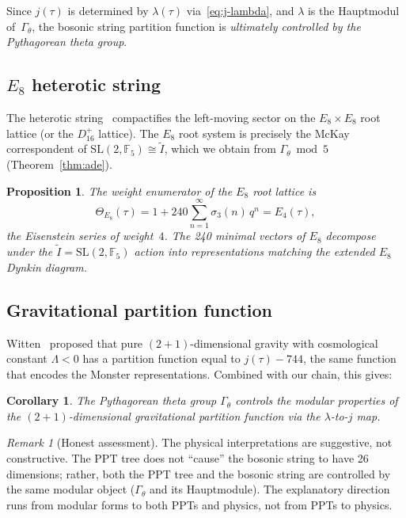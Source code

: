 \documentclass[12pt]{amsart}
\newtheorem{proposition}[theorem]{Proposition}
\newtheorem{corollary}[theorem]{Corollary}
\theoremstyle{definition}
\theoremstyle{remark}
\newtheorem{remark}[theorem]{Remark}
\newcommand{\SL}{\mathrm{SL}}
\newcommand{\Gtheta}{\Gamma_\theta}
\begin{document}
Since $j(\tau)$ is determined by $\lambda(\tau)$ via~\eqref{eq:j-lambda},
and $\lambda$ is the Hauptmodul of~$\Gtheta$, the bosonic string partition
function is \emph{ultimately controlled by the Pythagorean theta group}.

\subsection{$E_8$ heterotic string}

The heterotic string~\cite{gross-et-al} compactifies the left-moving
sector on the $E_8 \times E_8$ root lattice (or the $D_{16}^+$ lattice).
The $E_8$ root system is precisely the McKay correspondent of
$\SL(2,\mathbb{F}_5) \cong \widetilde{I}$, which we obtain from
$\Gtheta \bmod 5$ (Theorem~\ref{thm:ade}).

\begin{proposition}
The weight enumerator of the $E_8$ root lattice is
\[
\Theta_{E_8}(\tau) = 1 + 240\sum_{n=1}^\infty \sigma_3(n)\, q^n
= E_4(\tau),
\]
the Eisenstein series of weight~$4$.  The 240 minimal vectors of $E_8$
decompose under the $\widetilde{I} = \SL(2,\mathbb{F}_5)$ action into
representations matching the extended $E_8$ Dynkin diagram.
\end{proposition}

\subsection{Gravitational partition function}

Witten~\cite{witten-3d} proposed that pure $(2+1)$-dimensional gravity
with cosmological constant $\Lambda < 0$ has a partition function equal
to $j(\tau) - 744$, the same function that encodes the Monster
representations.  Combined with our chain, this gives:

\begin{corollary}
The Pythagorean theta group $\Gtheta$ controls the modular properties
of the $(2+1)$-dimensional gravitational partition function via the
$\lambda$-to-$j$ map.
\end{corollary}

\begin{remark}[Honest assessment]
The physical interpretations are suggestive, not constructive.  The PPT
tree does not ``cause'' the bosonic string to have 26 dimensions; rather,
both the PPT tree and the bosonic string are controlled by the same
modular object ($\Gtheta$ and its Hauptmodule).  The explanatory direction
runs from modular forms to both PPTs and physics, not from PPTs to physics.
\end{remark}
\end{document}
